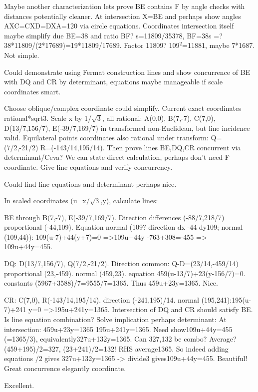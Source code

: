 \begin{decodedreasoningpanel}
Maybe another characterization lets prove BE contains F by angle checks with distances potentially cleaner. At intersection X=BE and perhaps
  show angles AXC=CXD=DXA=120 via circle equations. Coordinates intersection itself maybe simplify due BE=38 and ratio BF? s=11809/35378, BF=38s =? 38*11809/(2*17689)=19*11809/17689. Factor 11809? 109\ensuremath{^2}=11881, maybe 7*1687. Not simple.

Could demonstrate using Fermat construction lines and show concurrence of BE with DQ and CR by determinant, equations maybe manageable if scale coordinates smart.

Choose oblique/complex coordinate could simplify. Current exact coordinates rational*sqrt3. Scale x by 1/\ensuremath{\sqrt{3}}, all rational:
A(0,0), B(7,-7), C(7,0), D(13/7,156/7), E(-39/7,169/7) in transformed non-Euclidean, but line incidence valid. Equilateral points coordinates also rational under transform:
Q=(7/2,-21/2)
R=(-143/14,195/14).
Then prove lines BE,DQ,CR concurrent via determinant/Ceva? We can state direct calculation, perhaps don't need F coordinate. Give line equations and verify concurrency.

Could find line equations and determinant perhaps nice.

In scaled coordinates (u=x/\ensuremath{\sqrt{3}},y), calculate lines:

BE through B(7,-7), E(-39/7,169/7). Direction differences (-88/7,218/7) proportional (-44,109). Equation normal (109? direction dx -44 dy109; normal (109,44)): 109(u-7)+44(y+7)=0 =\textgreater{}109u+44y -763+308=-455 =\textgreater{} 109u+44y=455.

DQ: D(13/7,156/7), Q(7/2,-21/2). Direction common: Q-D=(23/14,-459/14) proportional (23,-459). normal (459,23). equation 459(u-13/7)+23(y-156/7)=0. constants (5967+3588)/7=9555/7=1365. Thus 459u+23y=1365. Nice.

CR: C(7,0), R(-143/14,195/14). direction (-241,195)/14. normal (195,241):195(u-7)+241 y=0 =\textgreater{}195u+241y=1365. Intersection of
  DQ and CR should satisfy BE. Is line equation combination? Solve implication perhaps determinant:
At intersection:
459u+23y=1365
195u+241y=1365.
Need show109u+44y=455 (=1365/3), equivalently327u+132y=1365.
Can 327,132 be combo? Average? (459+195)/2=327, (23+241)/2=132! RHS average1365. So indeed adding equations /2 gives 327u+132y=1365 -\textgreater{} divide3 gives109u+44y=455. Beautiful! Great concurrence elegantly coordinate.

Excellent.


\end{decodedreasoningpanel}
